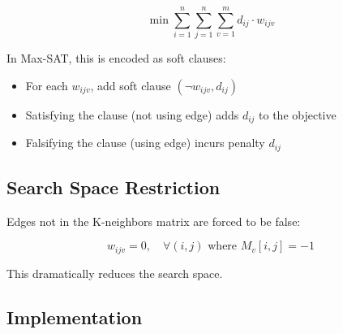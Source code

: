 \documentclass[12pt,a4paper]{article}
\theoremstyle{definition}
\begin{document}
\begin{equation}
\min \sum_{i=1}^{n} \sum_{j=1}^{n} \sum_{v=1}^{m} d_{ij} \cdot w_{ijv}
\end{equation}

In Max-SAT, this is encoded as soft clauses:
\begin{itemize}
    \item For each $w_{ijv}$, add soft clause $(\neg w_{ijv}, d_{ij})$
    \item Satisfying the clause (not using edge) adds $d_{ij}$ to the objective
    \item Falsifying the clause (using edge) incurs penalty $d_{ij}$
\end{itemize}

\subsection{Search Space Restriction}

Edges not in the K-neighbors matrix are forced to be false:

\begin{equation}
w_{ijv} = 0, \quad \forall (i,j) \text{ where } M_v[i,j] = -1
\end{equation}

This dramatically reduces the search space.

\subsection{Implementation}
\end{document}
